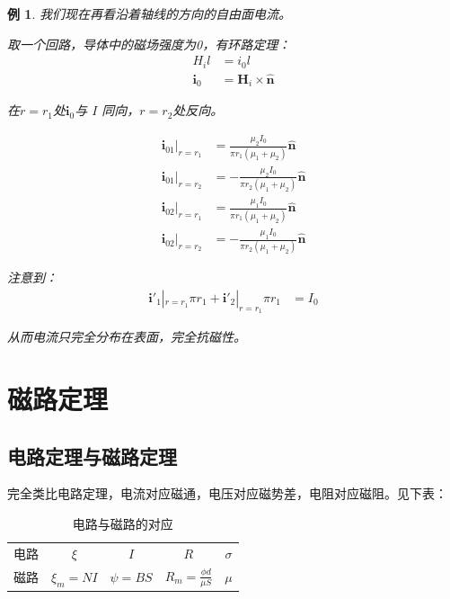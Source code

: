 \documentclass[12pt,onecolumn,a4paper]{book}
\newtheorem*{example}{例}
\numberwithin{table}{subsection}
\numberwithin{equation}{subsection}
\begin{document}
\begin{example}
        我们现在再看沿着轴线的方向的自由面电流。

        取一个回路，导体中的磁场强度为0，有环路定理：
        \begin{align}
            H_i l        & = i_0 l                                 \\
            \mathbf{i}_0 & =  \mathbf{H}_i \times \hat{\mathbf{n}}
        \end{align}

        在$r=r_1$处$\mathbf{i}_0$与 $I$ 同向，$ r=r_2$处反向。

        \begin{align}
            \mathbf{i}_01|_{r=r_1} & = \frac{\mu_2 I_0}{\pi r_1 (\mu_1+\mu_2)} \hat{\mathbf{n}}  \\
            \mathbf{i}_01|_{r=r_2} & = -\frac{\mu_2 I_0}{\pi r_2 (\mu_1+\mu_2)} \hat{\mathbf{n}} \\
            \mathbf{i}_02|_{r=r_1} & = \frac{\mu_1 I_0}{\pi r_1 (\mu_1+\mu_2)} \hat{\mathbf{n}}  \\
            \mathbf{i}_02|_{r=r_2} & = -\frac{\mu_1 I_0}{\pi r_2 (\mu_1+\mu_2)} \hat{\mathbf{n}}
        \end{align}

        注意到：
        \begin{align}
            \mathbf{i'}_1|_{r=r_1} \pi r_1 + \mathbf{i'}_2|_{r=r_1} \pi r_1 & = I_0
        \end{align}

        从而电流只完全分布在表面，完全抗磁性。
    \end{example}

    \section{磁路定理}

    \subsection{电路定理与磁路定理}
    完全类比电路定理，电流对应磁通，电压对应磁势差，电阻对应磁阻。见下表：
    \begin{table}[ht]
        \centering
        \begin{tabular}{ccccc}
            \hline
            电路 & $\xi$        & $I$         & $R$                          & $\sigma$ \\
            磁路 & $\xi_m = NI$ & $\psi = BS$ & $R_m = \frac{\phi d}{\mu S}$ & $\mu$    \\ \hline
        \end{tabular}
        \caption{电路与磁路的对应}
    \end{table}
\end{document}
